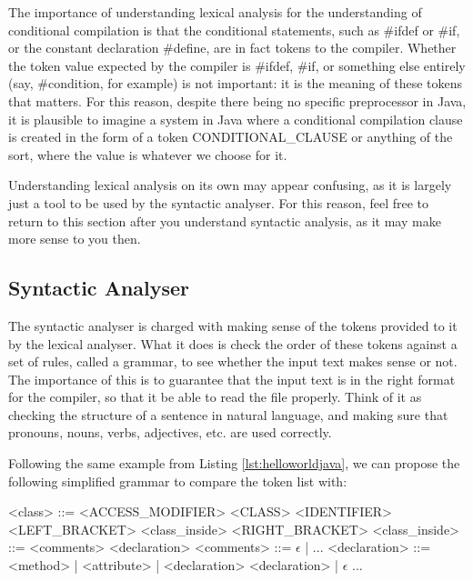 The importance of understanding lexical analysis for the understanding of conditional compilation is that the conditional statements, such as \#ifdef or \#if, or the constant declaration \#define, are in fact tokens to the compiler. Whether the token value expected by the compiler is \#ifdef, \#if, or something else entirely (say, \#condition, for example) is not important: it is the meaning of these tokens that matters. For this reason, despite there being no specific preprocessor in Java, it is plausible to imagine a system in Java where a conditional compilation clause is created in the form of a token CONDITIONAL_CLAUSE or anything of the sort, where the value is whatever we choose for it.

Understanding lexical analysis on its own may appear confusing, as it is largely just a tool to be used by the syntactic analyser. For this reason, feel free to return to this section after you understand syntactic analysis, as it may make more sense to you then.


\subsection{Syntactic Analyser}

The syntactic analyser is charged with making sense of the tokens provided to it by the lexical analyser. What it does is check the order of these tokens against a set of rules, called a grammar, to see whether the input text makes sense or not. The importance of this is to guarantee that the input text is in the right format for the compiler, so that it be able to read the file properly. Think of it as checking the structure of a sentence in natural language, and making sure that pronouns, nouns, verbs, adjectives, etc. are used correctly.

Following the same example from Listing \ref{lst:helloworldjava}, we can propose the following simplified grammar to compare the token list with:

\begin{listing}
\begin{grammar}
<class> ::= <ACCESS_MODIFIER> <CLASS> <IDENTIFIER> <LEFT_BRACKET> <class_inside> <RIGHT_BRACKET>
\alt<class_inside> ::= <comments> <declaration>
\alt<comments> ::= $\epsilon$ | ...
\alt<declaration> ::= <method> | <attribute> | <declaration> <declaration> | $\epsilon$
\alt...
\end{grammar}
\end{listing}

